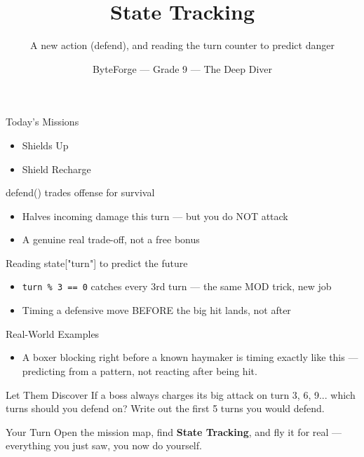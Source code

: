 \documentclass[aspectratio=169]{beamer}
\title{State Tracking}
\subtitle{A new action (defend), and reading the turn counter to predict danger}
\author{ByteForge --- Grade 9 --- The Deep Diver}
\date{}
\begin{document}
\begin{frame}
    \titlepage
\end{frame}

\begin{frame}{Today's Missions}
    \Large
    \begin{itemize}
        \item Shields Up
        \item Shield Recharge
    \end{itemize}
\end{frame}

\begin{frame}{defend() trades offense for survival}
    \large
    \begin{itemize}
        \item Halves incoming damage this turn --- but you do NOT attack
        \item A genuine real trade-off, not a free bonus
    \end{itemize}
\end{frame}


\begin{frame}{Reading state["turn"] to predict the future}
    \large
    \begin{itemize}
        \item \texttt{turn \% 3 == 0} catches every 3rd turn --- the same MOD trick, new job
        \item Timing a defensive move BEFORE the big hit lands, not after
    \end{itemize}
\end{frame}

\begin{frame}{Real-World Examples}
    \large
    \begin{itemize}
        \item A boxer blocking right before a known haymaker is timing exactly like this --- predicting from a pattern, not reacting after being hit.
    \end{itemize}
\end{frame}


\begin{frame}{Let Them Discover}
    \large
    If a boss always charges its big attack on turn 3, 6, 9... which turns should you defend on? Write out the first 5 turns you would defend.
\end{frame}

\begin{frame}{Your Turn}
    \Large
    Open the mission map, find \textbf{State Tracking}, and fly it for real ---
    everything you just saw, you now do yourself.
\end{frame}
\end{document}
